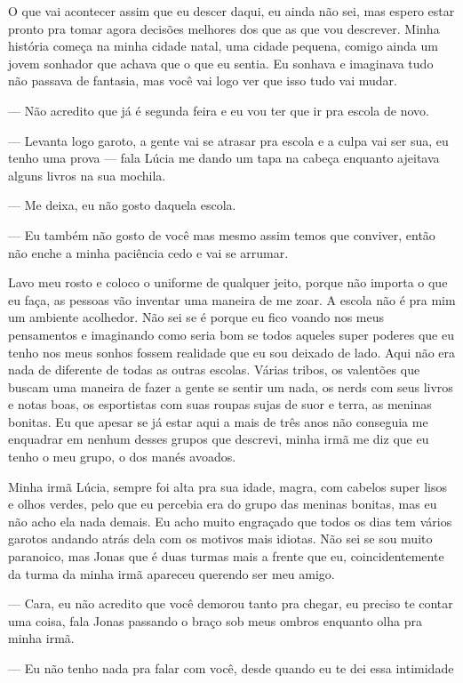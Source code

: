 O que vai acontecer assim que eu descer daqui, eu ainda não sei, mas espero estar pronto pra tomar agora decisões melhores dos que as que vou descrever.
Minha história começa na minha cidade natal, uma cidade pequena, comigo ainda um jovem sonhador que achava que o que eu sentia. Eu sonhava e imaginava tudo não passava de fantasia, mas você vai logo ver que isso tudo vai mudar.

— Não acredito que já é segunda feira e eu vou ter que ir pra escola de novo.

— Levanta logo garoto, a gente vai se atrasar pra escola e a culpa vai ser sua, eu tenho uma prova — fala Lúcia me dando um tapa na cabeça enquanto ajeitava alguns livros na sua mochila.

— Me deixa, eu não gosto daquela escola.

— Eu também não gosto de você mas mesmo assim temos que conviver, então não enche a minha paciência cedo e vai se arrumar.

Lavo meu rosto e coloco o uniforme de qualquer jeito, porque não importa o que eu faça, as pessoas vão inventar uma maneira de me zoar. A escola não é pra mim um ambiente acolhedor. Não sei se é porque eu fico voando nos meus pensamentos e imaginando como seria bom se todos aqueles super poderes que eu tenho nos meus sonhos fossem realidade que eu sou deixado de lado. Aqui não era nada de diferente de todas as outras escolas. Várias tribos, os valentões que buscam uma maneira de fazer a gente se sentir um nada, os nerds com seus livros e notas boas, os esportistas com suas roupas sujas de suor e terra, as meninas bonitas. Eu que apesar se já estar aqui a mais de três anos não conseguia me enquadrar em nenhum desses grupos que descrevi, minha irmã me diz que eu tenho o meu grupo, o dos manés avoados.

Minha irmã Lúcia, sempre foi alta pra sua idade, magra, com cabelos super lisos e olhos verdes, pelo que eu percebia era do grupo das meninas bonitas, mas eu não acho ela nada demais. Eu acho muito engraçado que todos os dias tem vários garotos andando atrás dela com os motivos mais idiotas. Não sei se sou muito paranoico, mas Jonas que é duas turmas mais a frente que eu, coincidentemente da turma da minha irmã apareceu querendo ser meu amigo.

— Cara, eu não acredito que você demorou tanto pra chegar, eu preciso te contar uma coisa, fala Jonas passando o braço sob meus ombros enquanto olha pra minha irmã.

— Eu não tenho nada pra falar com você, desde quando eu te dei essa intimidade

